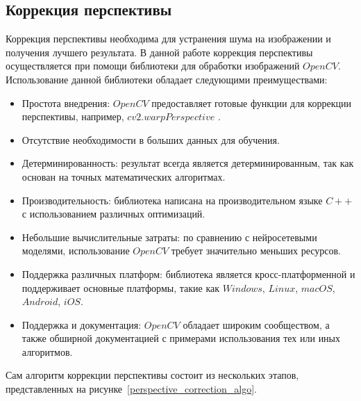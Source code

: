 \subsection{Коррекция перспективы}

Коррекция перспективы необходима для устранения шума на изображении и получения лучшего результата. 
В данной работе коррекция перспективы осуществляется при помощи библиотеки для обработки изображений $OpenCV$. Использование данной библиотеки обладает следующими преимуществами:
\begin{itemize}
    \item Простота внедрения: $OpenCV$ предоставляет готовые функции для коррекции перспективы, например, $cv2.warpPerspective$ \cite{opencv_perspective_transform}.
    \item Отсутствие необходимости в больших данных для обучения.
    \item Детерминированность: результат всегда является детерминированным, так как основан на точных математических алгоритмах.
    \item Производительность: библиотека написана на производительном языке $C++\;$ с использованием различных оптимизаций.
    \item Небольшие вычислительные затраты: по сравнению с нейросетевыми моделями, использование $OpenCV$ требует значительно меньших ресурсов.
    \item Поддержка различных платформ: библиотека является кросс-платформенной и поддерживает основные платформы, такие как $Windows$, $Linux$, $macOS$, $Android$, $iOS$.
    \item Поддержка и документация: $OpenCV$ обладает широким сообществом, а также обширной документацией с примерами использования тех или иных алгоритмов.
\end{itemize}

Сам алгоритм коррекции перспективы состоит из нескольких этапов, представленных на рисунке~\ref{perspective_correction_algo}. 

